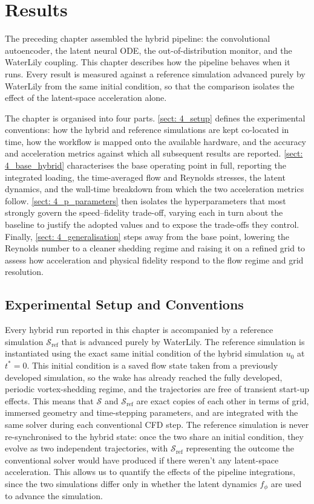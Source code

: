 \chapter{Results}
\label{chap: Results}

The preceding chapter assembled the hybrid pipeline: the convolutional autoencoder, the latent neural ODE, the out-of-distribution monitor, and the WaterLily coupling. This chapter describes how the pipeline behaves when it runs. Every result is measured against a reference simulation advanced purely by WaterLily from the same initial condition, so that the comparison isolates the effect of the latent-space acceleration alone.

The chapter is organised into four parts. \autoref{sect: 4_setup} defines the experimental conventions: how the hybrid and reference simulations are kept co-located in time, how the workflow is mapped onto the available hardware, and the accuracy and acceleration metrics against which all subsequent results are reported. \autoref{sect: 4_base_hybrid} characterises the base operating point in full, reporting the integrated loading, the time-averaged flow and Reynolds stresses, the latent dynamics, and the wall-time breakdown from which the two acceleration metrics follow. \autoref{sect: 4_p_parameters} then isolates the hyperparameters that most strongly govern the speed--fidelity trade-off, varying each in turn about the baseline to justify the adopted values and to expose the trade-offs they control. Finally, \autoref{sect: 4_generalisation} steps away from the base point, lowering the Reynolds number to a cleaner shedding regime and raising it on a refined grid to assess how acceleration and physical fidelity respond to the flow regime and grid resolution.


\section{Experimental Setup and Conventions}
\label{sect: 4_setup}

Every hybrid run reported in this chapter is accompanied by a reference simulation $\mathcal{S}_\text{ref}$ that is advanced purely by WaterLily. The reference simulation is instantiated using the exact same initial condition of the hybrid simulation $u_0$ at $t^*=0$. This initial condition is a saved flow state taken from a previously developed simulation, so the wake has already reached the fully developed, periodic vortex-shedding regime, and the trajectories are free of transient start-up effects. This means that $\mathcal{S}$ and $\mathcal{S}_\text{ref}$ are exact copies of each other in terms of grid, immersed geometry and time-stepping parameters, and are integrated with the same solver during each conventional CFD step. The reference simulation is never re-synchronised to the hybrid state: once the two share an initial condition, they evolve as two independent trajectories, with $\mathcal{S}_\text{ref}$ representing the outcome the conventional solver would have produced if there weren't any latent-space acceleration. This allows us to quantify the effects of the pipeline integrations, since the two simulations differ only in whether the latent dynamics $f_\phi$ are used to advance the simulation.

